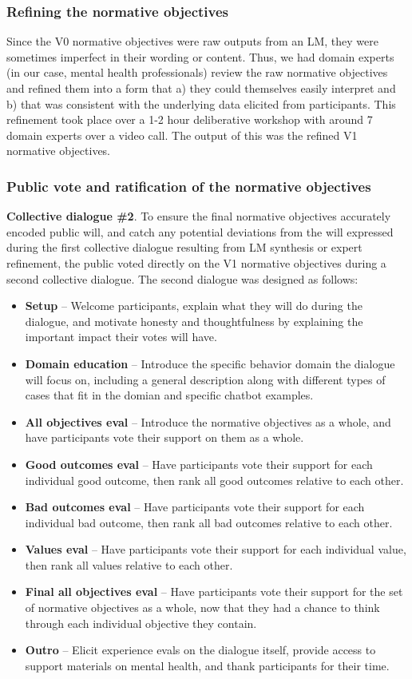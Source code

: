 \documentclass{article}
\begin{document}
\subsubsection{Refining the normative objectives}
Since the V0 normative objectives were raw outputs from an LM, they were sometimes imperfect in their wording or content. Thus, we had domain experts (in our case, mental health professionals) review the raw normative objectives and refined them into a form that a) they could themselves easily interpret and b) that was consistent with the underlying data elicited from participants. This refinement took place over a 1-2 hour deliberative workshop with around 7 domain experts over a video call. The output of this was the refined V1 normative objectives. 

\subsubsection{Public vote and ratification of the normative objectives}
\textbf{Collective dialogue \#2}. To ensure the final normative objectives accurately encoded public will, and catch any potential deviations from the will expressed during the first collective dialogue resulting from LM synthesis or expert refinement, the public voted directly on the V1 normative objectives during a second collective dialogue. The second dialogue was designed as follows:

\begin{itemize}
    \item \textbf{Setup} -- Welcome participants, explain what they will do during the dialogue, and motivate honesty and thoughtfulness by explaining the important impact their votes will have.
    \item \textbf{Domain education} -- Introduce the specific behavior domain the dialogue will focus on, including a general description along with different types of cases that fit in the domian and specific chatbot examples.  
    \item \textbf{All objectives eval} -- Introduce the normative objectives as a whole, and have participants vote their support on them as a whole. 
    \item \textbf{Good outcomes eval} -- Have participants vote their support for each individual good outcome, then rank all good outcomes relative to each other. 
    \item \textbf{Bad outcomes eval} -- Have participants vote their support for each individual bad outcome, then rank all bad outcomes relative to each other. 
    \item \textbf{Values eval} -- Have participants vote their support for each individual value, then rank all values relative to each other. 
    \item \textbf{Final all objectives eval} -- Have participants vote their support for the set of normative objectives as a whole, now that they had a chance to think through each individual objective they contain. 
    \item \textbf{Outro} -- Elicit experience evals on the dialogue itself, provide access to support materials on mental health, and thank participants for their time.
\end{itemize}
\end{document}
